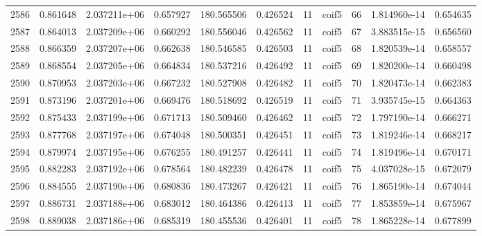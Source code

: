 \begin{tabular}{lrrrrrrlrrr}
2586 &    0.861648 &        2.037211e+06 &  0.657927 &              180.565506 &    0.426524 &      11 &        coif5 &     66 &   1.814960e-14 &      0.654635 \\
2587 &    0.864013 &        2.037209e+06 &  0.660292 &              180.556046 &    0.426562 &      11 &        coif5 &     67 &   3.883515e-15 &      0.656560 \\
2588 &    0.866359 &        2.037207e+06 &  0.662638 &              180.546585 &    0.426503 &      11 &        coif5 &     68 &   1.820539e-14 &      0.658557 \\
2589 &    0.868554 &        2.037205e+06 &  0.664834 &              180.537216 &    0.426492 &      11 &        coif5 &     69 &   1.820200e-14 &      0.660498 \\
2590 &    0.870953 &        2.037203e+06 &  0.667232 &              180.527908 &    0.426482 &      11 &        coif5 &     70 &   1.820473e-14 &      0.662383 \\
2591 &    0.873196 &        2.037201e+06 &  0.669476 &              180.518692 &    0.426519 &      11 &        coif5 &     71 &   3.935745e-15 &      0.664363 \\
2592 &    0.875433 &        2.037199e+06 &  0.671713 &              180.509460 &    0.426462 &      11 &        coif5 &     72 &   1.797190e-14 &      0.666271 \\
2593 &    0.877768 &        2.037197e+06 &  0.674048 &              180.500351 &    0.426451 &      11 &        coif5 &     73 &   1.819246e-14 &      0.668217 \\
2594 &    0.879974 &        2.037195e+06 &  0.676255 &              180.491257 &    0.426441 &      11 &        coif5 &     74 &   1.819496e-14 &      0.670171 \\
2595 &    0.882283 &        2.037192e+06 &  0.678564 &              180.482239 &    0.426478 &      11 &        coif5 &     75 &   4.037028e-15 &      0.672079 \\
2596 &    0.884555 &        2.037190e+06 &  0.680836 &              180.473267 &    0.426421 &      11 &        coif5 &     76 &   1.865190e-14 &      0.674044 \\
2597 &    0.886731 &        2.037188e+06 &  0.683012 &              180.464386 &    0.426413 &      11 &        coif5 &     77 &   1.853859e-14 &      0.675967 \\
2598 &    0.889038 &        2.037186e+06 &  0.685319 &              180.455536 &    0.426401 &      11 &        coif5 &     78 &   1.865228e-14 &      0.677899 \\

\end{tabular}
